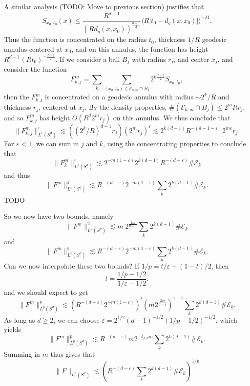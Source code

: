 A similar analysis (TODO: Move to previous section) justifies that
%
\[ {S\!}_{x_0,t_0}(x) \leq \frac{R^{d-1}}{( R d_g(x,x_0) )^{\frac{d-1}{2}}} \Big\langle R \big| t_0 - d_g(x,x_0) \big| \Big\rangle^{-M}. \]
%
Thus the function is concentrated on the radius $t_0$, thickness $1/R$ geodesic annulus centered at $x_0$, and on this annulus, the function has height $R^{d-1} (R t_0)^{- \frac{d-1}{2}}$. If we consider a ball $B_j$ with radius $r_j$, and center $x_j$, and consider the function
%
\[ F^m_{k,j} = \sum_k \sum_{(x_0,t_0) \in \mathcal{E}_{k,m} \cap B_j} 2^{k \frac{d-1}{2}} {S\!}_{x_0,t_0}, \]
%
then the $F^m_{k,j}$ is concentrated on a geodesic annulus with radius $\sim 2^k / R$ and thickness $r_j$, centered at $x_j$. By the density properties, $\# ( \mathcal{E}_{k,m} \cap B_j ) \leq 2^m R r_j$, and so $F^m_{k,j}$ has height $O(R^d 2^m r_j)$ on this annulus. We thus conclude that
%
%
\[ \| F^m_{k,j} \|_{L^\varepsilon(S^d)}^\varepsilon \lesssim \left( ( 2^k / R )^{d-1} r_j \right) \left( 2^m r_j \right)^\varepsilon \lesssim 2^{k(d-1)} R^{-(d-1-\varepsilon)} 2^{m\varepsilon} r_j. \]
%
For $\varepsilon < 1$, we can sum in $j$ and $k$, using the concentrating properties to conclude that
%
\[ \| F^m_k \|_{L^\varepsilon(S^d)}^\varepsilon \lesssim 2^{-m(1-\varepsilon)} 2^{k(d-1)} R^{-(d - \varepsilon)} \# \mathcal{E}_k \]
%
and thus
%
\[ \| F^m \|_{L^\varepsilon(S^d)}^\varepsilon \lesssim R^{-(d-\varepsilon)} 2^{-m(1 - \varepsilon)} \sum_k 2^{k(d-1)} \# \mathcal{E}_k. \]
%
TODO

So we now have two bounds, namely
%
\[ \| F^m \|_{L^2(S^d)}^2 \lesssim m\; 2^{\frac{2m}{d-1}} \sum_k 2^{k(d-1)} \# \mathcal{E}_k \]
%
and
%
\[ \| F^m \|_{L^\varepsilon(S^d)}^\varepsilon \lesssim R^{-(d-\varepsilon)} 2^{-m(1 - \varepsilon)} \sum_k 2^{k(d-1)} \# \mathcal{E}_k. \]
%
Can we now interpolate these two bounds? If $1/p = t/\varepsilon + (1 - t)/2$, then
%
\[ t = \frac{1/p - 1/2}{1/\varepsilon - 1/2}. \]
%
and we should expect to get
%
\[ \| F^m \|_{L^p(S^d)}^p \lesssim \left( R^{-(d - \varepsilon)} 2^{-m(1 - \varepsilon)} \right)^t \left( m 2^{\frac{2m}{d-1}} \right)^{1 - t} \sum_k 2^{k(d-1)} \# \mathcal{E}_k. \]
%
As long as $d \geq 2$, we can choose $\varepsilon = 2^{1/2} (d-1)^{-1/2} (1/p - 1/2)^{-1/2}$, which yields
%
\[ \| F^m \|_{L^p(S^d)}^p \lesssim R^{-(d - \varepsilon)} m 2^{-\delta_{p,d} m} \sum_k 2^{k(d-1)} \# \mathcal{E}_k. \]
%
Summing in $m$ thus gives that
%
\[ \| F \|_{L^p(S^d)} \lesssim \left( R^{-(d - \varepsilon)} \sum_k 2^{k(d-1)} \# \mathcal{E}_k \right)^{1/p} \]
%
%
%


